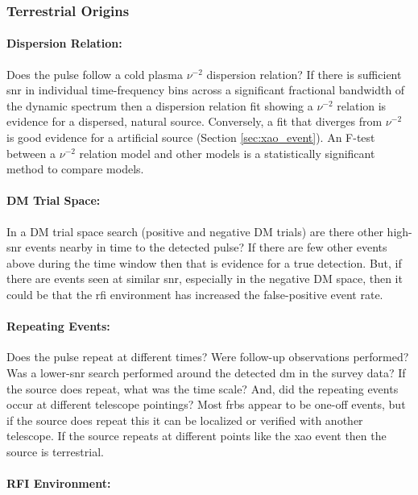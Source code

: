 \documentclass[a4paper,fleqn,usenatbib]{mnras}
\begin{document}
\subsubsection{Terrestrial Origins}

\paragraph{Dispersion Relation:}

Does the pulse follow a cold plasma $\nu^{-2}$ dispersion relation? If there is
sufficient \gls{snr} in individual time-frequency bins across a significant
fractional bandwidth of the dynamic spectrum then a dispersion relation fit
showing a $\nu^{-2}$ relation is evidence for a dispersed, natural source.
Conversely, a fit that diverges from $\nu^{-2}$ is good evidence for a
artificial source (Section \ref{sec:xao_event}). An F-test between a $\nu^{-2}$
relation model and other models is a statistically significant method to compare
models.

\paragraph{DM Trial Space:}

In a DM trial space search (positive and negative DM trials) are there other
high-\gls{snr} events nearby in time to the detected pulse? If there are few
other events above during the time window then that is evidence for a true
detection. But, if there are events seen at similar \gls{snr}, especially in the
negative DM space, then it could be that the \gls{rfi} environment has
increased the false-positive event rate.

\paragraph{Repeating Events:}

Does the pulse repeat at different times? Were follow-up observations performed?
Was a lower-\gls{snr} search performed around the detected \gls{dm} in the
survey data? If the source does repeat, what was the time scale? And, did the
repeating events occur at different telescope pointings? Most \glspl{frb} appear
to be one-off events, but if the source does repeat this it can be localized or
verified with another telescope. If the source repeats at different points like
the \gls{xao} event then the source is terrestrial.

\paragraph{RFI Environment:}
\end{document}
